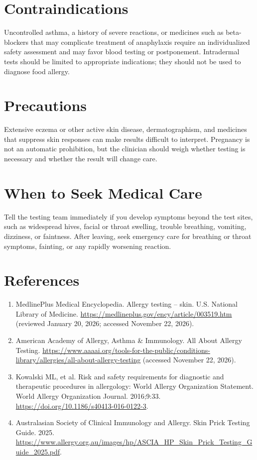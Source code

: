 \section*{Contraindications}
Uncontrolled asthma, a history of severe reactions, or medicines such as beta-blockers that may complicate treatment of anaphylaxis require an individualized safety assessment and may favor blood testing or postponement. Intradermal tests should be limited to appropriate indications; they should not be used to diagnose food allergy.

\section*{Precautions}
Extensive eczema or other active skin disease, dermatographism, and medicines that suppress skin responses can make results difficult to interpret. Pregnancy is not an automatic prohibition, but the clinician should weigh whether testing is necessary and whether the result will change care.

\section*{When to Seek Medical Care}
Tell the testing team immediately if you develop symptoms beyond the test sites, such as widespread hives, facial or throat swelling, trouble breathing, vomiting, dizziness, or faintness. After leaving, seek emergency care for breathing or throat symptoms, fainting, or any rapidly worsening reaction.

\section*{References}
\begin{enumerate}
  \item MedlinePlus Medical Encyclopedia. Allergy testing -- skin. U.S. National Library of Medicine. \url{https://medlineplus.gov/ency/article/003519.htm} (reviewed January 20, 2026; accessed November 22, 2026).
  \item American Academy of Allergy, Asthma \& Immunology. All About Allergy Testing. \url{https://www.aaaai.org/tools-for-the-public/conditions-library/allergies/all-about-allergy-testing} (accessed November 22, 2026).
  \item Kowalski ML, et al. Risk and safety requirements for diagnostic and therapeutic procedures in allergology: World Allergy Organization Statement. World Allergy Organization Journal. 2016;9:33. \url{https://doi.org/10.1186/s40413-016-0122-3}.
  \item Australasian Society of Clinical Immunology and Allergy. Skin Prick Testing Guide. 2025. \url{https://www.allergy.org.au/images/hp/ASCIA_HP_Skin_Prick_Testing_Guide_2025.pdf}.
\end{enumerate}
\clearpage
